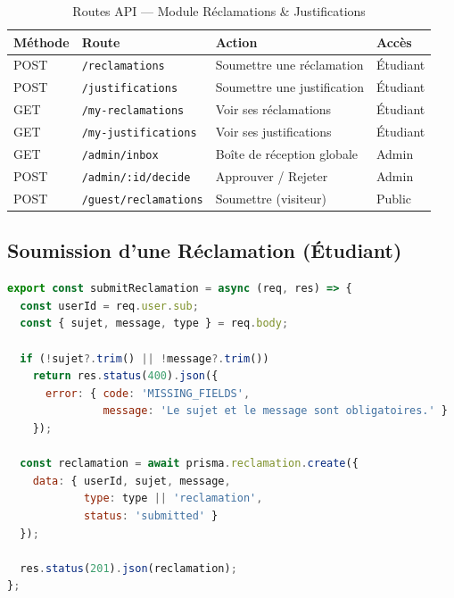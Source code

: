 \begin{table}[H]
\centering
\caption{Routes API — Module Réclamations \& Justifications}
\begin{tabularx}{\linewidth}{@{}llLl@{}}
\toprule
\textbf{Méthode} & \textbf{Route}                    & \textbf{Action}                  & \textbf{Accès}  \\
\midrule
POST & \texttt{/reclamations}             & Soumettre une réclamation         & Étudiant        \\
POST & \texttt{/justifications}           & Soumettre une justification       & Étudiant        \\
GET  & \texttt{/my-reclamations}          & Voir ses réclamations             & Étudiant        \\
GET  & \texttt{/my-justifications}        & Voir ses justifications           & Étudiant        \\
GET  & \texttt{/admin/inbox}              & Boîte de réception globale        & Admin           \\
POST & \texttt{/admin/:id/decide}         & Approuver / Rejeter               & Admin           \\
POST & \texttt{/guest/reclamations}       & Soumettre (visiteur)              & Public          \\
\bottomrule
\end{tabularx}
\end{table}

\subsection{Soumission d'une Réclamation (Étudiant)}

\begin{lstlisting}[language=JavaScript,
  caption=request.controller.ts — Soumission d'une réclamation]
export const submitReclamation = async (req, res) => {
  const userId = req.user.sub;
  const { sujet, message, type } = req.body;

  if (!sujet?.trim() || !message?.trim())
    return res.status(400).json({
      error: { code: 'MISSING_FIELDS',
               message: 'Le sujet et le message sont obligatoires.' }
    });

  const reclamation = await prisma.reclamation.create({
    data: { userId, sujet, message,
            type: type || 'reclamation',
            status: 'submitted' }
  });

  res.status(201).json(reclamation);
};
\end{lstlisting}

